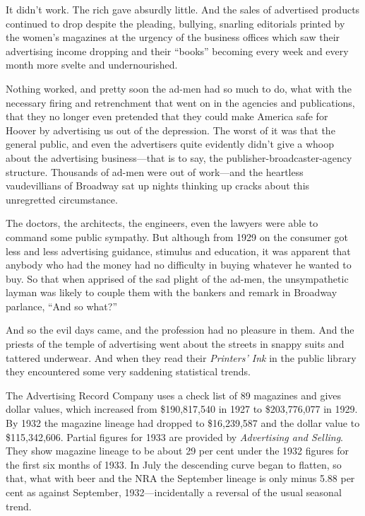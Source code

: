 \documentclass[twoside,nohyper,openany,nobib]{tufte-book}
\begin{document}
It didn't work. The rich gave absurdly little. And the sales of
advertised products continued to drop despite the pleading, bullying,
snarling editorials printed by the women's magazines at the urgency of
the business offices which saw their advertising income dropping and
their ``books'' becoming every week and every month more svelte and
undernourished.

Nothing worked, and pretty soon the ad-men had so much to do, what with
the necessary firing and retrenchment that went on in the agencies and
publications, that they no longer even pretended that they could make
America safe for Hoover by advertising us out of the depression. The
worst of it was that the general public, and even the advertisers quite
evidently didn't give a whoop about the advertising business---that is
to say, the publisher-broadcaster-agency structure. Thousands of ad-men
were out of work---and the heartless vaudevillians of Broadway sat up
nights thinking up cracks about this unregretted circumstance.

The doctors, the architects, the engineers, even the lawyers were able
to command some public sympathy. But although from 1929 on the consumer
got less and less advertising guidance, stimulus and education, it was
apparent that anybody who had the money had no difficulty in buying
whatever he wanted to buy. So that when apprised of the sad plight of
the ad-men, the unsympathetic layman was likely to couple them with the
bankers and remark in Broadway parlance, ``And so what?''

And so the evil days came, and the profession had no pleasure in them.
And the priests of the temple of advertising went about the streets in
snappy suits and tattered underwear. And when they read their
\emph{Printers' Ink} in the public library they encountered some very
saddening statistical trends.

The Advertising Record Company uses a check list of 89 magazines and
gives dollar values, which increased from \$190,817,540 in 1927 to
\$203,776,077 in 1929. By 1932 the magazine lineage had dropped to
\$16,239,587 and the dollar value to \$115,342,606. Partial figures for
1933 are provided by \emph{Advertising and Selling}. They show magazine
lineage to be about 29 per cent under the 1932 figures for the first six
months of 1933. In July the descending curve began to flatten, so that,
what with beer and the NRA the September lineage is only minus 5.88 per
cent as against September, 1932---incidentally a reversal of the usual
seasonal trend.
\end{document}
